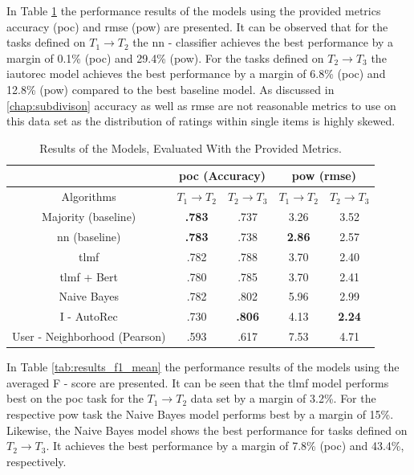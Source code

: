 \noindent In Table \ref{tab:results} the performance results of the models using the provided metrics accuracy (\acrshort{poc}) and \acrshort{rmse} (\acrshort{pow}) are presented. It can be observed that for the tasks defined on $T_1 \to T_2$ the \acrfull{nn} - classifier achieves the best performance by a margin of 0.1\% (\acrshort{poc}) and 29.4\% (\acrshort{pow}). For the tasks defined on $T_2 \to T_3$ the \acrshort{iautorec} model achieves the best performance by a margin of 6.8\% (\acrshort{poc}) and 12.8\% (\acrshort{pow}) compared to the best baseline model. As discussed in \ref{chap:subdivison} accuracy as well as \acrshort{rmse} are not reasonable metrics to use on this data set as the distribution of ratings within single items is highly skewed.

\begin{table}[h!]
    \centering
    \begin{tabular}{|c|c|c|c|c|}
    \hline
     & \multicolumn{2}{|c|}{\acrshort{poc} (Accuracy)} & \multicolumn{2}{|c|}{\acrshort{pow} (\acrshort{rmse})} \\
     \hline
    Algorithms & $T_1 \to T_2$ & $T_2 \to T_3$ & $T_1 \to T_2$ & $T_2 \to T_3$\\
    \hline  Majority (baseline) & \textbf{.783} & .737 & 3.26 & 3.52 \\
    \acrshort{nn} (baseline) & \textbf{.783} & .738 & \textbf{2.86} & 2.57\\
    \acrshort{tlmf} & .782 & .788 & 3.70 & 2.40 \\
    \acrshort{tlmf} + Bert & .780 & .785 & 3.70 & 2.41\\
    Naive Bayes & .782 & .802 & 5.96 & 2.99 \\
    I - AutoRec & .730 & \textbf{.806} & 4.13 & \textbf{2.24}\\
    User - Neighborhood (Pearson) & .593 & .617 & 7.53 & 4.71\\
    \hline
    \end{tabular}
    \caption{Results of the Models, Evaluated With the Provided Metrics.}
    \label{tab:results}
\end{table}
\noindent In Table \ref{tab:results_f1_mean} the performance results of the models using the averaged F - score are presented. It can be seen that the \acrshort{tlmf} model performs best on the \acrshort{poc} task for the $T_1 \to T_2$ data set by a margin of 3.2\%. For the respective \acrshort{pow} task the Naive Bayes model performs best by a margin of 15\%. Likewise, the Naive Bayes model shows the best performance for tasks defined on $T_2 \to T_3$. It achieves the best performance by a margin of 7.8\% (\acrshort{poc}) and 43.4\%, respectively.

